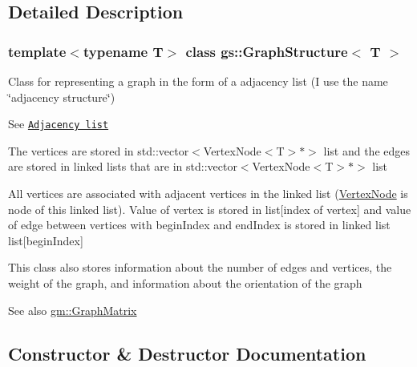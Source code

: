 \subsection{Detailed Description}
\subsubsection*{template$<$typename T$>$\newline
class gs\+::\+Graph\+Structure$<$ T $>$}

Class for representing a graph in the form of a adjacency list (I use the name \char`\"{}adjacency structure\char`\"{}) 

See \href{https://en.wikipedia.org/wiki/Adjacency_list}{\tt Adjacency list}

The vertices are stored in \textquotesingle{}std\+::vector$<$Vertex\+Node$<$\+T$>$$\ast$$>$ list\textquotesingle{} and the edges are stored in linked lists that are in \textquotesingle{}std\+::vector$<$Vertex\+Node$<$\+T$>$$\ast$$>$ list\textquotesingle{}

All vertices are associated with adjacent vertices in the linked list (\mbox{\hyperlink{structgs_1_1_vertex_node}{Vertex\+Node}} is node of this linked list). Value of vertex is stored in \textquotesingle{}list\mbox{[}index of vertex\mbox{]}\textquotesingle{} and value of edge between vertices with \textquotesingle{}begin\+Index\textquotesingle{} and \textquotesingle{}end\+Index\textquotesingle{} is stored in linked list \textquotesingle{}list\mbox{[}begin\+Index\mbox{]}\textquotesingle{}

This class also stores information about the number of edges and vertices, the weight of the graph, and information about the orientation of the graph

\begin{DoxySeeAlso}{See also}
\mbox{\hyperlink{classgm_1_1_graph_matrix}{gm\+::\+Graph\+Matrix}} 
\end{DoxySeeAlso}


\subsection{Constructor \& Destructor Documentation}
\mbox{\label{classgs_1_1_graph_structure_a5a816a9d12685c2c429958131cd950a6}} 
